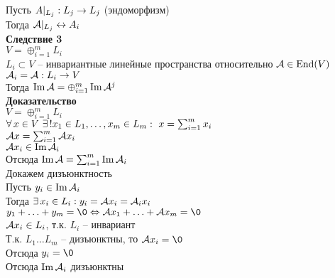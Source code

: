 \documentclass[12pt]{article}
\begin{document}
Пусть $A|_{L_j}: L_j \rightarrow L_j$ (эндоморфизм)\\
Тогда $\mathcal{A}|_{L_j} \leftrightarrow A_i$\\
\textbf{Следствие 3}\\
$V = \oplus_{i=1}^m L_i$\\
$L_i \subset V$ -- инвариантные линейные пространства относительно $\mathcal{A} \in \operatorname{End}(V)$\\
$\mathcal{A}_i = \mathcal{A}: L_i \rightarrow V$\\
Тогда $\operatorname{Im} \mathcal{A} = \oplus_{i=1}^m \operatorname{Im} \mathcal{A}^j$\\
\textbf{Доказательство}\\
$V = \oplus_{i=1}^m L_i$\\
$\forall\, x\in V\ \exists\,! x_1 \in L_1,\ldots,x_m \in L_m:\ x=\sum_{i=1}^m x_i$\\
$\mathcal{A} x = \sum_{i=1}^m \mathcal{A} x_i$\\
$\mathcal{A} x_i \in \operatorname{Im} \mathcal{A}_i$\\
Отсюда $\operatorname{Im} \mathcal{A} = \sum_{i=1}^m \operatorname{Im} \mathcal{A}_i$\\
Докажем дизъюнктность\\
Пусть $y_i \in \operatorname{Im} \mathcal{A}_i$\\
Тогда $\exists\, x_i \in L_i: y_i = \mathcal{A} x_i = \mathcal{A}_i x_i$\\
$y_1+\ldots+y_m = \0 \LRto \mcA x_1 + \ldots + \mcA x_m = \0$\\
$\mathcal{A} x_i \in L_i$, т.к. $L_i$ -- инвариант\\
Т.к. $L_1\ldots L_m$ -- дизъюнктны, то $\mcA x_i = \0$\\
Отсюда $y_i = \0$\\
Отсюда $\operatorname{Im} \mathcal{A}_i$ дизъюнктны
\end{document}
